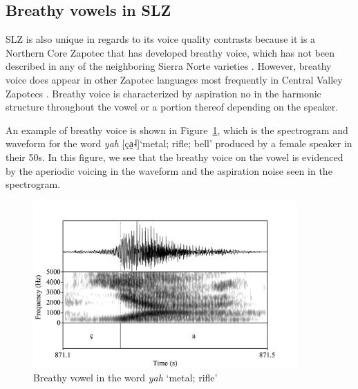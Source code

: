 \subsection{Breathy vowels in SLZ} \label{sec:SLZ-voicequality-breathy}
SLZ is also unique in regards to its voice quality contrasts because it is a Northern Core Zapotec that has developed breathy voice, which has not been described in any of the neighboring Sierra Norte varieties \citep{nellisFortisLenisCajonos1980,jaegerInitialConsonantClusters1982,butlerh.DiccionarioZapotecoYatzachi1997,avelinoTopicsYalalagZapotec2004,sonnenscheinDescriptiveGrammarSan2005,longDiccionarioZapotecoSan2005}. However, breathy voice does appear in other Zapotec languages most frequently in Central Valley Zapotecs \citep{munroDicsyonaaryTeenDiizh1999,espositoSantaAnaValle2004,espositoVariationContrastivePhonation2010,uchiharaToneRegistrogenesisQuiavini2016,ariza-garciaPhonationTypesTones2018}. Breathy voice is characterized by aspiration no in the harmonic structure throughout the vowel or a portion thereof depending on the speaker. 

An example of breathy voice is shown in Figure~\ref{fig:BreathyVowel}, which is the spectrogram and waveform for the word \textit{yah} [ça̤˨]`metal; rifle; bell' produced by a female speaker in their 50s. In this figure, we see that the breathy voice on the vowel is evidenced by the aperiodic voicing in the waveform and the aspiration noise seen in the spectrogram.

\begin{figure}[h!]
    \centering
    \includegraphics[width=0.9\textwidth]{images/Spectrograms/yah.png}
    \caption{Breathy vowel in the word \textit{yah} `metal; rifle'}
    \label{fig:BreathyVowel}
\end{figure}

